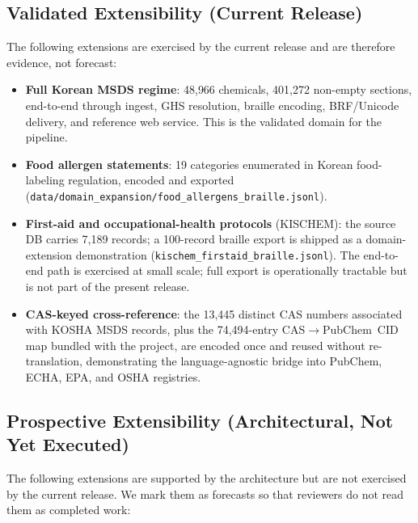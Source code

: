 \documentclass[smallextended]{svjour3}
\begin{document}
\subsection{Validated Extensibility (Current Release)}

The following extensions are exercised by the current release and are therefore evidence, not forecast:

\begin{itemize}
\item \textbf{Full Korean MSDS regime}: 48{,}966 chemicals, 401{,}272 non-empty sections, end-to-end through ingest, GHS resolution, braille encoding, BRF/Unicode delivery, and reference web service. This is the validated domain for the pipeline.
\item \textbf{Food allergen statements}: 19 categories enumerated in Korean food-labeling regulation, encoded and exported (\texttt{data/domain\_expansion/food\_allergens\_braille.jsonl}).
\item \textbf{First-aid and occupational-health protocols} (KISCHEM): the source DB carries 7{,}189 records; a 100-record braille export is shipped as a domain-extension demonstration (\texttt{kischem\_firstaid\_braille.jsonl}). The end-to-end path is exercised at small scale; full export is operationally tractable but is not part of the present release.
\item \textbf{CAS-keyed cross-reference}: the 13{,}445 distinct CAS numbers associated with KOSHA MSDS records, plus the 74{,}494-entry CAS$\rightarrow$PubChem~CID map bundled with the project, are encoded once and reused without re-translation, demonstrating the language-agnostic bridge into PubChem, ECHA, EPA, and OSHA registries.
\end{itemize}

\subsection{Prospective Extensibility (Architectural, Not Yet Executed)}

The following extensions are supported by the architecture but are not exercised by the current release. We mark them as forecasts so that reviewers do not read them as completed work:
\end{document}
